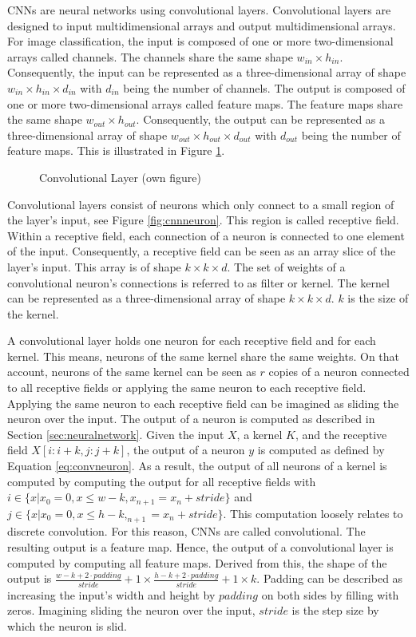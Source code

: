 \ac{CNN}s are neural networks using convolutional layers. Convolutional layers are designed to input multidimensional arrays and output multidimensional arrays. 
%
For image classification, the input is composed of one or more two-dimensional arrays called channels. The channels share the same shape $w_{in} \times h_{in}$.
Consequently, the input can be represented as a three-dimensional array of shape $w_{in} \times h_{in} \times d_{in}$ with $d_{in}$ being the number of channels.
%
The output is composed of one or more two-dimensional arrays called feature maps. The feature maps share the same shape $w_{out} \times h_{out}$. Consequently, the output can be represented as a three-dimensional array of shape $w_{out} \times h_{out} \times d_{out}$ with $d_{out}$ being the number of feature maps. \autocites{LeCun.2015b}{LeCun.1998}
This is illustrated in Figure \ref{fig:cnnlayer}.
\begin{figure}[H]
	\centering
	
	\caption{Convolutional Layer (own figure)} \label{fig:cnnlayer}
\end{figure}
\par
Convolutional layers consist of neurons which only connect to a small region of the layer's input, see Figure \ref{fig:cnnneuron}. This region is called receptive field\autocite{LeCun.1998}. Within a receptive field, each connection of a neuron is connected to one element of the input. Consequently, a receptive field can be seen as an array slice of the layer's input. This array is of shape $k \times k \times d$.
The set of weights of a convolutional neuron's connections is referred to as filter or kernel.
The kernel can be represented as a three-dimensional array of shape $k \times k \times d$. $k$ is the size of the kernel. \autocites{Rawat.2017}{LeCun.2015b}
\par
A convolutional layer holds one neuron for each receptive field and for each kernel. This means, neurons of the same kernel share the same weights. On that account, neurons of the same kernel can be seen as $r$ copies of a neuron connected to all receptive fields or applying the same neuron to each receptive field. Applying the same neuron to each receptive field can be imagined as sliding the neuron over the input. The output of a neuron is computed as described in Section \ref{sec:neuralnetwork}. Given the input $X$, a kernel $K$, and the receptive field $X[i:i+k, j:j+k]$, the output of a neuron $y$ is computed as defined by Equation \eqref{eq:convneuron}. As a result, the output of all neurons of a kernel is computed by computing the output for all receptive fields with $i \in \{x|x_0=0, x \le w-k, x_{n+1} = x_n+stride\}$ and $j \in \{x|x_0=0, x \le h-k, _{n+1} = x_n+stride\}$. This computation loosely relates to discrete convolution. For this reason, \ac{CNN}s are called convolutional. The resulting output is a feature map. Hence, the output of a convolutional layer is computed by computing all feature maps. Derived from this, the shape of the output is $\frac{w-k+2 \cdot padding}{stride}+1 \times \frac{h-k+2 \cdot padding}{stride}+1 \times k$. Padding can be described as increasing  the input's width and height by $padding$ on both sides by filling with zeros. Imagining sliding the neuron over the input, $stride$ is the step size by which the neuron is slid. \autocite{Goodfellow.2016}
